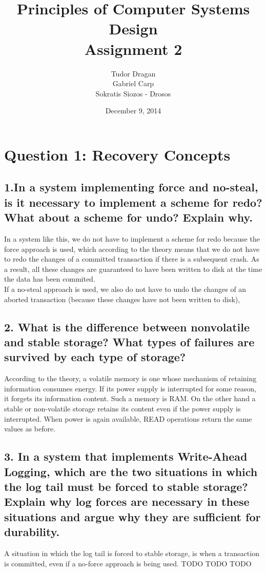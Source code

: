 \documentclass{article}      %
\title{\bf Principles of Computer Systems Design\\ {\Large Assignment 2}}  %
\author{Tudor Dragan\\
Gabriel Carp\\
Sokratis Siozos - Drosos}      %
\date{December 9, 2014}      %
\begin{document}

\maketitle                   %

\section*{Question 1: Recovery Concepts} 


\subsection*{1.In a system implementing force and no-steal, is it necessary to implement a scheme for redo? What about a scheme for undo? Explain why.}

In a system like this, we do not have to implement a scheme for redo because the force approach is used, which according to the theory means that we do not have to redo the changes of a committed transaction if there is a subsequent crash. As a result, all these changes are guaranteed to have been written to disk at the time the data has been commited. \\

If a no-steal approach is used, we also do not have to undo the changes of an aborted transaction (because these changes have not been written to disk),\\


\subsection*{2.  What is the difference between nonvolatile and stable storage? What types of failures are survived by each type of storage?}

According to the theory, a volatile memory is one whose mechanism of retaining information consumes energy. If its power supply is interrupted for some reason, it forgets its information content. Such a memory is RAM. On the other hand a stable or non-volatile storage retains its content even if the power supply is interrupted. When power is again available, READ operations return the same values as before.\\

\subsection*{3.  In a system that implements Write-Ahead Logging, which are the two situations in which the log tail must be forced to stable storage? Explain why log forces are necessary in these situations and argue why they are sufficient for durability.}
A situation in which the log tail is forced to stable storage, is when a transaction is committed, even if a no-force approach is being used.
TODO TODO TODO\\
\end{document}
